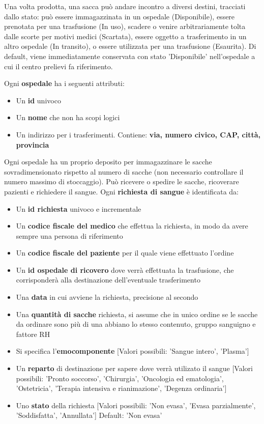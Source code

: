\documentclass[10pt, a4paper]{article}
\begin{document}
Una volta prodotta, una sacca può andare incontro a diversi destini, tracciati dallo stato: può essere immagazzinata in un ospedale (Disponibile), essere prenotata per una trasfusione (In uso), scadere o venire arbitrariamente tolta dalle scorte per motivi medici (Scartata), essere oggetto a trasferimento in un altro ospedale (In transito), o essere utilizzata per una trasfusione (Esaurita).
Di default, viene immediatamente conservata con stato 'Disponibile' nell'ospedale a cui il centro prelievi fa riferimento. 

Ogni \textbf{ospedale} ha i seguenti attributi:

\begin{itemize}
    \item Un \textbf{id} univoco
    \item Un \textbf{nome} che non ha scopi logici
    \item Un indirizzo per i trasferimenti. Contiene: \textbf{via, numero civico, CAP, città, provincia}
\end{itemize}

Ogni ospedale ha un proprio deposito per immagazzinare le sacche sovradimensionato rispetto al numero di sacche (non necessario controllare il numero massimo di stoccaggio). Può ricevere o spedire le sacche, ricoverare pazienti e richiedere il sangue. Ogni \textbf{richiesta di sangue} è identificata da:

\begin{itemize}
    \item Un \textbf{id richiesta} univoco e incrementale
    \item Un \textbf{codice fiscale del medico} che effettua la richiesta, in modo da avere sempre una persona di riferimento
    \item Un \textbf{codice fiscale del paziente} per il quale viene effettuato l'ordine
    \item Un \textbf{id ospedale di ricovero} dove verrà effettuata la trasfusione, che corrisponderà alla destinazione dell'eventuale trasferimento
    \item Una \textbf{data} in cui avviene la richiesta, precisione al secondo
    \item Una \textbf{quantità di sacche} richiesta, si assume che in unico ordine se le sacche da ordinare sono più di una abbiano lo stesso contenuto, gruppo sanguigno e fattore RH
    \item Si specifica l'\textbf{emocomponente} [Valori possibili: 'Sangue intero', 'Plasma']
    \item Un \textbf{reparto} di destinazione per sapere dove verrà utilizato il sangue [Valori possibili: 'Pronto soccorso', 'Chirurgia', 'Oncologia ed ematologia', 'Ostetricia', 'Terapia intensiva e rianimazione', 'Degenza ordinaria']
    \item Uno \textbf{stato} della richiesta [Valori possibili: 'Non evasa', 'Evasa parzialmente', 'Soddisfatta', 'Annullata'] Default: 'Non evasa'
\end{itemize}
\end{document}
